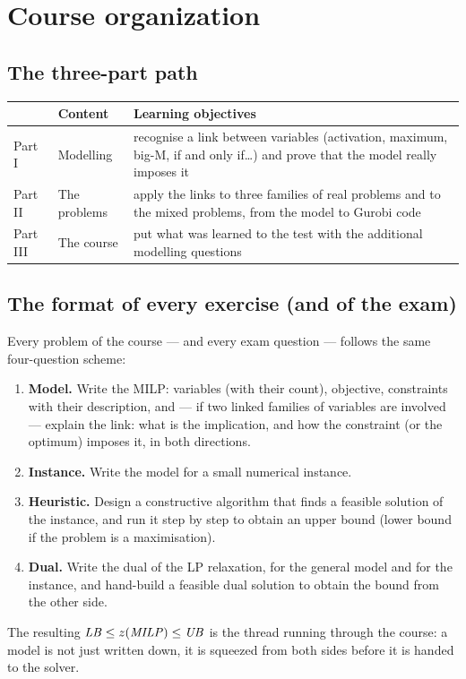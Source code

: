 \chapter{Course organization}
\label{cap:organization}

\section{The three-part path}

\begin{center}\small
\begin{tabular}{lp{4cm}p{7cm}}
\toprule
& Content & Learning objectives \\
\midrule
Part I & Modelling & recognise a link between variables (activation, maximum,
big-M, if and only if\ldots) and prove that the model really imposes it \\
Part II & The problems & apply the links to three families of real problems and to the mixed problems,
from the model to Gurobi code \\
Part III & The course & put what was learned to the test with the additional
modelling questions \\
\bottomrule
\end{tabular}
\end{center}

\section{The format of every exercise (and of the exam)}

Every problem of the course --- and every exam question --- follows the same
four-question scheme:
\begin{enumerate}
\item \textbf{Model.} Write the MILP: variables (with their count), objective,
      constraints with their description, and --- if two linked families of
      variables are involved --- explain the link: what is the implication,
      and how the constraint (or the optimum) imposes it, in both directions.
\item \textbf{Instance.} Write the model for a small numerical instance.
\item \textbf{Heuristic.} Design a constructive algorithm that finds a
      feasible solution of the instance, and run it step by step to obtain
      an upper bound (lower bound if the problem is a maximisation).
\item \textbf{Dual.} Write the dual of the LP relaxation, for the general
      model and for the instance, and hand-build a feasible dual solution to
      obtain the bound from the other side.
\end{enumerate}
The resulting $\mathit{LB} \le z(\mathit{MILP}) \le \mathit{UB}$ is the thread running through the
course: a model is not just written down, it is squeezed from both sides
before it is handed to the solver.

